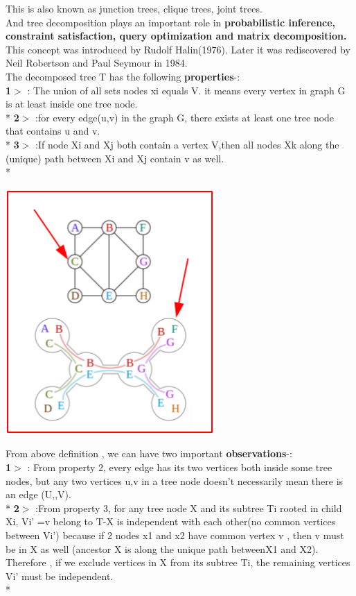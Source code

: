 \documentclass[12pt]{book}
\begin{document}
This is also known as junction trees, clique trees, joint trees. \\
 
And tree decomposition plays an important role in \textbf{probabilistic inference, constraint satisfaction, query optimization and matrix decomposition.}\\

This concept was introduced by Rudolf Halin(1976). Later it was rediscovered by Neil Robertson and Paul Seymour in 1984.\\

The decomposed tree T has the following \textbf{properties}-:\\
\textbf{1$>$} : The union of all sets nodes xi equals V. it means every vertex in graph G is at least inside one tree node.\\*
\textbf{2$>$} :for every edge(u,v) in the graph G, there exists at least one tree node that contains u and v.\\*
\textbf{3$>$} :If node Xi and Xj both contain a vertex V,then all nodes Xk along the (unique) path between Xi and Xj contain v as well.\\*
\begin{center}
    \includegraphics[width =8cm]{C5jV73V.png}    
\end{center}


From above definition , we can have two important \textbf{observations}-:\\
\newline
\textbf{1$>$} : From property 2, every edge has its two vertices both inside some tree nodes, but any two vertices u,v 
in a tree node doesn’t necessarily mean there is an edge
(U,,V).\\*
\textbf{2$>$} :From property 3, for any tree node X and its subtree Ti rooted in child Xi, Vi’ ={v belong to T-X} is independent with each other(no common vertices between Vi’) because if 2 nodes x1 and x2 have common vertex v , then v must be in X as well (ancestor X is along the unique path betweenX1 and X2). Therefore , if we exclude vertices in X from its subtree Ti, the remaining vertices Vi’ must be independent.\\*
\end{document}
